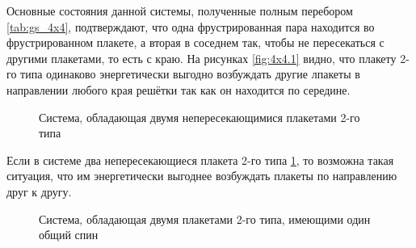 \documentclass[utf8, babel, sor, jor, amsmath, amssymb, reprint]{elsarticle} %
\begin{document}
Основные состояния данной системы, полученные полным перебором \ref{tab:gs_4x4}, подтверждают, что одна фрустрированная пара находится во фрустрированном плакете, а вторая в соседнем так, чтобы не пересекаться с другими плакетами, то есть с краю. На рисунках \ref{fig:4x4.1} видно, что плакету 2-го типа одинаково энергетически выгодно возбуждать другие лпакеты в направлении любого края решётки так как он находится по середине.

\begin{figure}[H]
	\centering
	\caption{Система, обладающая двумя непересекающимися плакетами 2-го типа}
	\label{fig:4x7}
\end{figure}


Если в системе два непересекающиеся плакета 2-го типа \ref{fig:4x7}, то возможна такая ситуация, что им энергетически выгоднее возбуждать плакеты по направлению друг к другу.

\begin{figure}[H]
	\centering
	\caption{Система, обладающая двумя плакетами 2-го типа, имеющими один общий спин}
	\label{fig:5x5.2F}
\end{figure}
\end{document}
